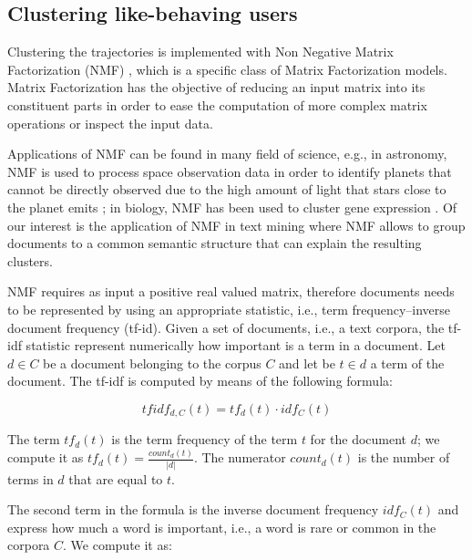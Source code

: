 \subsection{Clustering like-behaving users}
Clustering the trajectories is implemented with Non Negative Matrix Factorization (NMF)
\cite{nmf:majorcontribution:1999}, which is a specific class of Matrix Factorization models. Matrix Factorization has the objective of reducing an input matrix into its constituent parts in order to ease the computation of more complex matrix operations or inspect the input data. 

Applications of NMF can be found in many field of science, e.g., in astronomy, NMF is used to process space observation data in order to identify planets that cannot be directly observed due to the high amount of light that stars close to the planet emits \cite{nmf_astronomy:2018}; in biology, NMF has been used to cluster gene expression \cite{nmf_biology:2012}. Of our interest is the application of NMF in text mining where NMF allows to group documents to a common semantic structure that can explain the resulting clusters.

NMF requires as input a positive real valued matrix, therefore documents needs to be represented by using an appropriate statistic, i.e., term frequency–inverse document frequency (tf-id). Given a set of documents, i.e., a text corpora, the tf-idf statistic represent numerically how important is a term in a document. Let $d \in C$ be a document belonging to the corpus $C$ and let be $t \in d$ a term of the document. The tf-idf is computed by means of the following formula:

$$tfidf_{d,C}(t) = tf_d(t) \cdot idf_C(t)$$

The term $tf_d(t)$ is the term frequency of the term $t$ for the document $d$; we compute it as 
$tf_d(t) = \frac{count_{d}(t)}{|d|}$. The numerator $count_d(t)$ is the number of terms in $d$ that are equal to $t$. 

The second term in the formula is the inverse document frequency $idf_C(t)$ and express how much a word is important, i.e., a word is rare or common in the corpora $C$. We compute it as:

